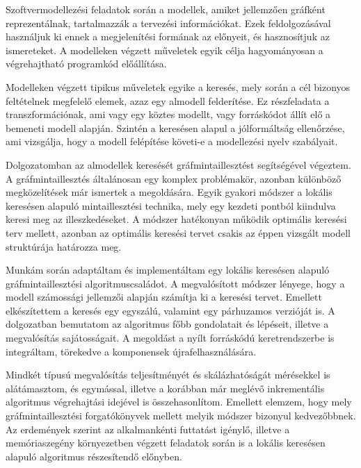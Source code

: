 Szoftvermodellezési feladatok során a modellek, amiket jellemzően gráfként reprezentálnak, tartalmazzák a tervezési információkat. Ezek feldolgozásával használjuk ki ennek a megjelenítési formának az előnyeit, és hasznosítjuk az ismereteket. A modelleken végzett műveletek egyik célja hagyományosan a végrehajtható programkód előállítása.

Modelleken végzett tipikus műveletek egyike a keresés, mely során a cél bizonyos feltételnek megfelelő elemek, azaz egy almodell felderítése. Ez részfeladata a transzformációnak, ami vagy egy köztes modellt, vagy forráskódot állít elő a bemeneti modell alapján. Szintén a keresésen alapul a jólformáltság ellenőrzése, ami vizsgálja, hogy a modell felépítése követi-e a modellezési nyelv szabályait. 

Dolgozatomban az almodellek keresését gráfmintaillesztést segítségével végeztem. A gráfmintaillesztés általánosan egy komplex problémakör, azonban különböző megközelítések már ismertek a megoldására. Egyik gyakori módszer a lokális keresésen alapuló mintaillesztési technika, mely egy kezdeti pontból kiindulva keresi meg az illeszkedéseket. A módszer hatékonyan működik optimális keresési terv mellett, azonban az optimális keresési tervet csakis az éppen vizsgált modell struktúrája határozza meg.

Munkám során adaptáltam és implementáltam egy lokális keresésen alapuló gráfmintaillesztési algoritmuscsaládot. A megvalósított módszer lényege, hogy a modell számossági jellemzői alapján számítja ki a keresési tervet. Emellett elkészítettem a keresés egy egyszálú, valamint egy párhuzamos verzióját is. A dolgozatban bemutatom az algoritmus főbb gondolatait és lépéseit, illetve a megvalósítás sajátosságait. A megoldást a nyílt forráskódú \eiq keretrendszerbe is integráltam, törekedve a komponensek újrafelhasználására.

Mindkét típusú megvalósítás teljesítményét és skálázhatóságát mérésekkel is alátámasztom, és egymással, illetve a korábban már meglévő inkrementális algoritmus végrehajtási idejével is összehasonlítom. Emellett elemzem, hogy mely gráfmintaillesztési forgatókönyvek mellett melyik módszer bizonyul kedvezőbbnek. Az erdemények szerint az alkalmankénti futtatást igénylő, illetve a memóriaszegény környezetben végzett feladatok során is a lokális keresésen alapuló algoritmus részesítendő előnyben.

\vfill
\selectenglish


